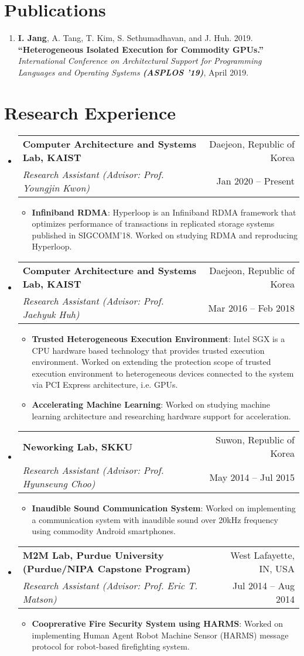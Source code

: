 \documentclass[letterpaper,oneside,12pt]{article}
\makeatletter
\newcommand{\resumeItem}[2]{
  \item\small{
    \textbf{#1}{: #2 \vspace{-2pt}}
  }
}
\newcommand{\resumeSubheading}[4]{
  \vspace{-1pt}\item
    \begin{tabular*}{0.97\textwidth}[t]{l@{\extracolsep{\fill}}r}
      \textbf{#1} & #2 \\
      \textit{\small#3} & \small #4 \\
    \end{tabular*}\vspace{-5pt}
}
\newcommand{\resumeSubHeadingListStart}{\begin{itemize}[leftmargin=*]}
\newcommand{\resumeSubHeadingListEnd}{\end{itemize}}
\newcommand{\resumeItemListStart}{\begin{itemize}}
\newcommand{\resumeItemListEnd}{\end{itemize}\vspace{-5pt}}
\makeatother
\begin{document}
\section{Publications}
\begin{enumerate}[leftmargin=*]
  \item \small \textbf{I. Jang}, A. Tang, T. Kim, S. Sethumadhavan, and J. Huh. 2019. \textbf{``Heterogeneous Isolated Execution for Commodity GPUs.''} \textit{International Conference on Architectural Support for Programming Languages and Operating Systems \textbf{(ASPLOS ’19)}}, April 2019.
\end{enumerate}

\section{Research Experience}
  \resumeSubHeadingListStart
    \resumeSubheading
      {Computer Architecture and Systems Lab, KAIST}{Daejeon, Republic of Korea}
      {Research Assistant (Advisor: Prof. Youngjin Kwon)}{Jan 2020 -- Present}
      \resumeItemListStart
        \resumeItem{Infiniband RDMA}
          {Hyperloop is an Infiniband RDMA framework that optimizes performance of transactions in replicated storage systems published in SIGCOMM'18. Worked on studying RDMA and reproducing Hyperloop.}
      \resumeItemListEnd
    \resumeSubheading
      {Computer Architecture and Systems Lab, KAIST}{Daejeon, Republic of Korea}
      {Research Assistant (Advisor: Prof. Jaehyuk Huh)}{Mar 2016 -- Feb 2018}
      \resumeItemListStart
        \resumeItem{Trusted Heterogeneous Execution Environment}
          {Intel SGX is a CPU hardware based technology that provides trusted execution environment. Worked on extending the protection scope of trusted execution environment to heterogeneous devices connected to the system via PCI Express architecture, i.e. GPUs.}
        \resumeItem{Accelerating Machine Learning}
          {Worked on studying machine learning architecture and researching hardware support for acceleration.}
      \resumeItemListEnd
    \resumeSubheading{Neworking Lab, SKKU}{Suwon, Republic of Korea}
      {Research Assistant (Advisor: Prof. Hyunseung Choo)}{May 2014 -- Jul 2015}
      \resumeItemListStart
        \resumeItem{Inaudible Sound Communication System}
          {Worked on implementing a communication system with inaudible sound over 20kHz frequency using commodity Android smartphones.}
      \resumeItemListEnd
    \resumeSubheading{M2M Lab, Purdue University \footnotesize{(Purdue/NIPA Capstone Program)}}{West Lafayette, IN, USA}
      {Research Assistant (Advisor: Prof. Eric T. Matson)}{Jul 2014 -- Aug 2014}
      \resumeItemListStart
        \resumeItem{Cooprerative Fire Security System using HARMS}
          {Worked on implementing Human Agent Robot Machine Sensor (HARMS) message protocol for robot-based firefighting system.}
      \resumeItemListEnd
  \resumeSubHeadingListEnd
\end{document}
